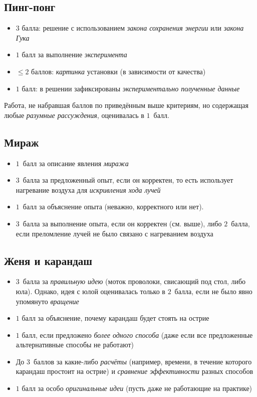\documentclass[10pt, a4paper, oneside, fleqn]{article}
\newcommand\т{~--- }
\def\le{\leqslant}
\newenvironment{items}
{\begin{itemize}%
\setlength{\itemsep}{-1pt}}
{\end{itemize}}
\begin{document}
\newpage

\subsection{Пинг-понг}

\begin{items}
\item $3$ балла: решение с использованием \emph{закона сохранения энергии} или \emph{закона Гука}
\item $1$ балл за выполнение \emph{эксперимента}
\item $\le 2$ баллов: \emph{картинка} установки (в зависимости от качества)
\item $1$ балл: в решении зафиксированы \emph{экспериментально полученные данные}
\end{items}

Работа, не набравшая баллов по приведённым выше критериям, но содержащая любые \emph{разумные рассуждения}, оценивалась в $1$~балл.

\subsection{Мираж}

\begin{items}
\item $1$~балл за описание явления \emph{миража}
\item $3$~балла за предложенный опыт, если он корректен, то есть использует нагревание воздуха для \emph{искривления хода лучей}
\item $1$~балл за объяснение опыта (неважно, корректного или нет).
\item $3$~балла за выполнение опыта, если он корректен (см. выше), либо $2$~балла, если преломление лучей
не было связано с нагреванием воздуха
\end{items}

\subsection{Женя и карандаш}

\begin{items}
\item $3$~балла за \emph{правильную идею} (моток проволоки, свисающий под стол, либо юла).
Однако, идея с юлой оценивалась только в $2$~балла, если не было явно упомянуто \emph{вращение}

\item $1$ балл за объяснение, почему карандаш будет стоять на острие

\item $1$ балл, если предложено \emph{более одного способа} (даже если все предложенные альтернативные способы не работают)

\item До $3$~баллов за какие-либо \emph{расчёты} (например, времени, в течение которого карандаш простоит на острие)
и \emph{сравнение эффективности} разных способов

\item $1$ балл за особо \emph{оригинальные идеи} (пусть даже не работающие на практике)
\end{items}
\end{document}
